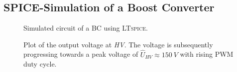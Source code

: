     \subsection{\textsc{SPICE}-Simulation of a Boost Converter}\label{sec:A2_spice_boost}
        \begin{figure}[H]
            \centering
            
            \caption[Simulated circuit of a BC.]{Simulated circuit of a BC using \textsc{LTspice}.}
            \label{fig:simCircuit}
        \end{figure}
        \begin{figure}[H]
            \centering
            
            \caption[Simulated output voltages at various duty cycles]{Plot of the output voltage at \textit{HV}. The voltage is subsequently progressing towards a peak voltage of \( \hat{U}_{HV} \approx \SI{150}{V} \) with rising PWM duty cycle.}
            \label{fig:plotSimCircuit}
        \end{figure}
